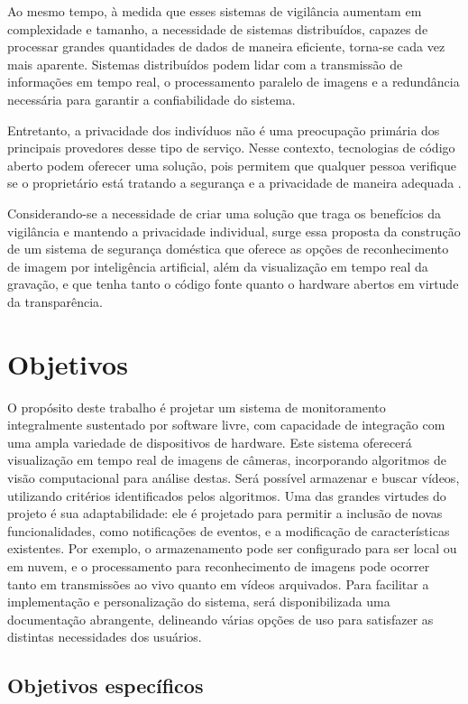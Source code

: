 \documentclass[12pt, %
openright, 
oneside, %
a4paper,    %
brazil]{facom-ufu-abntex2}
\begin{document}
Ao mesmo tempo, à medida que esses sistemas de vigilância aumentam em
complexidade e tamanho, a necessidade de sistemas distribuídos, capazes de
processar grandes quantidades de dados de maneira eficiente, torna-se cada vez
mais aparente. Sistemas distribuídos podem lidar com a transmissão de
informações em tempo real, o processamento paralelo de imagens e a redundância
necessária para garantir a confiabilidade do sistema.

Entretanto, a privacidade dos indivíduos não é uma preocupação primária dos
principais provedores desse tipo de serviço. Nesse contexto, tecnologias de
código aberto podem oferecer uma solução, pois permitem que qualquer pessoa
verifique se o proprietário está tratando a segurança e a privacidade de
maneira adequada \cite{mardjan2016open}.

Considerando-se a necessidade de criar uma solução que traga os benefícios da
vigilância e mantendo a privacidade individual, surge essa proposta da
construção de um sistema de segurança doméstica que oferece as opções de
reconhecimento de imagem por inteligência artificial, além da visualização em
tempo real da gravação, e que tenha tanto o código fonte quanto o hardware
abertos em virtude da transparência.

\section{Objetivos}

O propósito deste trabalho é projetar um sistema de monitoramento integralmente
sustentado por software livre, com capacidade de integração com uma ampla
variedade de dispositivos de hardware. Este sistema oferecerá visualização em
tempo real de imagens de câmeras, incorporando algoritmos de visão
computacional para análise destas. Será possível armazenar e buscar vídeos,
utilizando critérios identificados pelos algoritmos. Uma das grandes virtudes
do projeto é sua adaptabilidade: ele é projetado para permitir a inclusão de
novas funcionalidades, como notificações de eventos, e a modificação de
características existentes. Por exemplo, o armazenamento pode ser configurado
para ser local ou em nuvem, e o processamento para reconhecimento de imagens
pode ocorrer tanto em transmissões ao vivo quanto em vídeos arquivados. Para
facilitar a implementação e personalização do sistema, será disponibilizada uma
documentação abrangente, delineando várias opções de uso para satisfazer as
distintas necessidades dos usuários.

\subsection{Objetivos específicos}
\end{document}
